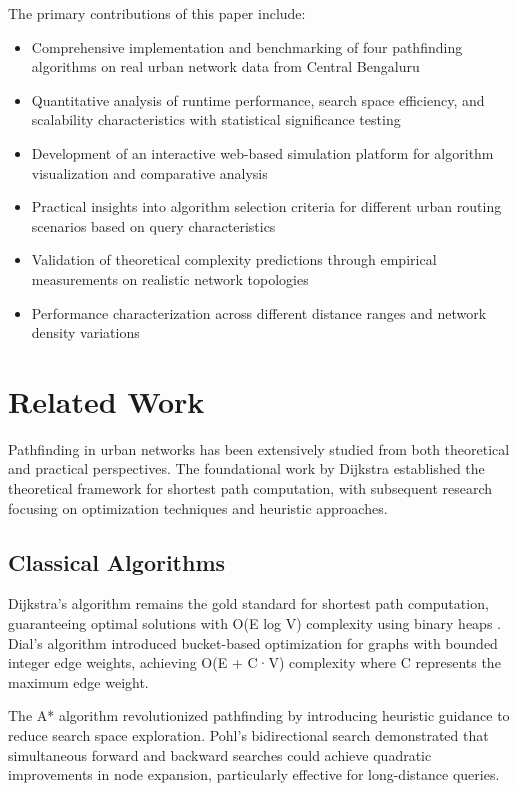 \documentclass[conference]{IEEEtran}
\begin{document}
The primary contributions of this paper include:
\begin{itemize}
\item Comprehensive implementation and benchmarking of four pathfinding algorithms on real urban network data from Central Bengaluru
\item Quantitative analysis of runtime performance, search space efficiency, and scalability characteristics with statistical significance testing
\item Development of an interactive web-based simulation platform for algorithm visualization and comparative analysis
\item Practical insights into algorithm selection criteria for different urban routing scenarios based on query characteristics
\item Validation of theoretical complexity predictions through empirical measurements on realistic network topologies
\item Performance characterization across different distance ranges and network density variations
\end{itemize}

\section{Related Work}

Pathfinding in urban networks has been extensively studied from both theoretical and practical perspectives. The foundational work by Dijkstra \cite{dijkstra1959note} established the theoretical framework for shortest path computation, with subsequent research focusing on optimization techniques and heuristic approaches.

\subsection{Classical Algorithms}

Dijkstra's algorithm remains the gold standard for shortest path computation, guaranteeing optimal solutions with O(E log V) complexity using binary heaps \cite{cormen2009introduction}. Dial's algorithm \cite{dial1969algorithm} introduced bucket-based optimization for graphs with bounded integer edge weights, achieving O(E + C·V) complexity where C represents the maximum edge weight.

The A* algorithm \cite{hart1968formal} revolutionized pathfinding by introducing heuristic guidance to reduce search space exploration. Pohl's bidirectional search \cite{pohl1971bidirectional} demonstrated that simultaneous forward and backward searches could achieve quadratic improvements in node expansion, particularly effective for long-distance queries.
\end{document}
